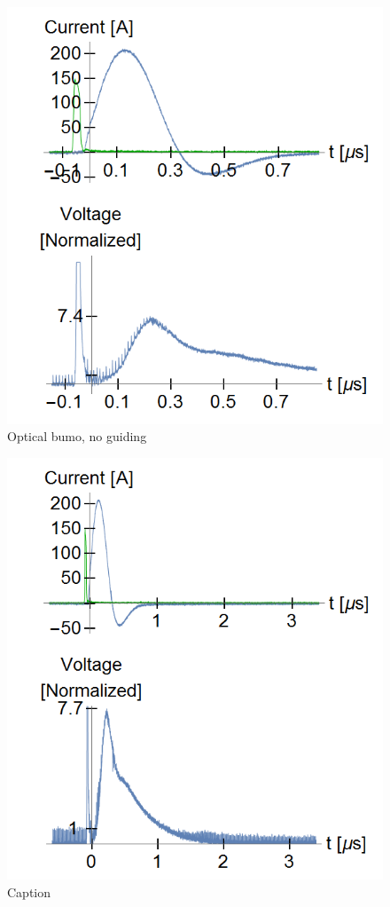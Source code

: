\documentclass[../main.tex]{subfiles}
\begin{document}
\begin{figure}
    \centering
    \includegraphics[width=\textwidth]{figures/Curved capillaries/curved-pulsetrain-short.png}
    \caption{Optical bumo, no guiding}
    \label{fig:bump-shortwindow}
\end{figure}
\begin{figure}
    \centering
    \includegraphics[width=\textwidth]{figures/Curved capillaries/curved-pulsetrain-long.png}
    \caption{Caption}
    \label{fig:bump-longwindow}
\end{figure}
\end{document}
